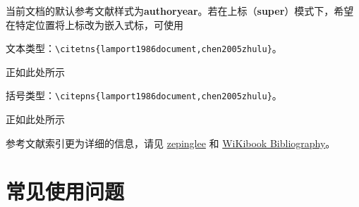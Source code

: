 当前文档的默认参考文献样式为\textbf{authoryear}。若在上标（\textbf{super}）模式下，希望在特定位置将上标改为嵌入式标，可使用

文本类型：\verb|\citetns{lamport1986document,chen2005zhulu}|。

正如此处所示

括号类型：\verb|\citepns{lamport1986document,chen2005zhulu}|。

正如此处所示

参考文献索引更为详细的信息，请见 \href{https://github.com/zepinglee/gbt7714-bibtex-style}{zepinglee} 和 \href{https://en.wikibooks.org/wiki/LaTeX/Bibliography_Management}{WiKibook Bibliography}。

\nocite{*}

\section{常见使用问题}\label{sec:qa}

